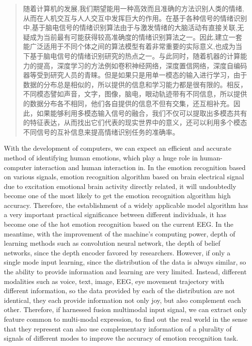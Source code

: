 
\begin{abstract}
随着计算机的发展,我们期望能用一种高效而且准确的方法识别人类的情绪,从而在人机交互与人人交互中发挥巨大的作用。在基于各种信号的情绪识别中,基于脑电信号的情绪识别算法由于与激发情绪的大脑活动有直接关联,无疑成为当前最有可能获得较高准确度的情绪识别算法之一。因此,建立一套能广泛适用于不同个体之间的算法模型有着非常重要的实际意义,也成为当下基于脑电信号的情绪识别研究的热点之一。与此同时，随着机器的计算能力的提高，深度学习的方法例如卷积神经网络，深度置信网络，深度自编码器等受到研究人员的青睐。但是如果只是用单一模态的输入进行学习，由于数据的分布总是相似的，所以提供的信息和学习能力都是很有限的。相反，不同模态譬如声音，文字，图像，脑电，眼动轨迹带有不同信息，所以提供的数据分布各不相同，他们各自提供的信息不但有交集，还互相补充。因此，如果能够利用多模态输入信号的融合，我们不仅可以提取出多模态共有的特征表达，从而找出它们代表的现实世界中的意义，还可以利用多个模态不同信号的互补信息来提高情绪识别任务的准确率。

\end{abstract}

\begin{englishabstract}

	With the development of computers, we can expect an efficient and accurate method of identifying human emotions, which play a huge role in human-computer interaction and human interaction in. In the emotion recognition based on various signals, emotion recognition algorithm based on brain electrical signal due to excitation emotional brain activity directly related, it will undoubtedly become one of the most likely to get the emotion recognition algorithm high accuracy. Therefore, the establishment of a widely applicable model algorithm has a very important practical significance between different individuals, it has become one of the hot emotion recognition based on the current EEG. In the meantime, with the improvement of the machine's computing power, depth of learning methods such as convolution neural network, the depth of belief networks, since the depth encoder favored by researchers. However, if only a single mode input learning, since the distribution of the data is always similar, so the ability to provide information and learning are very limited. Instead, different modalities such as voice, text, image, EEG, eye movement trajectory with different information, so the data provided by each of the distribution are not identical, they each provide information not only joy, but also complement each other. Therefore, if harnessed fusion multimodal input signal, we can extract only feature common to multi-modal expression, to find out the real world in the sense that they represent can also use complementary information of a plurality of signals of different modes to improve the accuracy of emotion recognition task.
	
\end{englishabstract}

